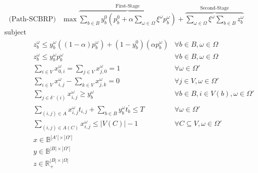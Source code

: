 \begin{align}
	\text{(Path-SCBRP)} & \max \overbrace{\sum_{b \in B} y_{b}^{0}(p_{b}^{0} + \alpha \sum_{\omega \in \Omega} \xi^{\omega} p_{b}^{\omega})}^{\text{First-Stage}} + \overbrace{\sum_{\omega \in \Omega} \xi^{\omega} \sum_{b \in B} z_{b}^{\omega}}^{\text{Second-Stage}} & \label{eq:sof}
\end{align}
\begin{align}
	\nonumber \text{subject to:} &                                                                                                         &                                                                                     \\
	                             & z_{b}^{\omega} \leq y_{b}^{\omega}((1 - \alpha)p_{b}^{\omega}) + (1 - y_{b}^{0})(\alpha p_{b}^{\omega}) & \forall b \in B, \omega \in \Omega \label{eq:stochastic-z-value}                    \\
	                             & z_{b}^{\omega} \leq y_{b}^{\omega}p_{b}^{\omega}                                                        & \forall b \in B, \omega \in \Omega \label{eq:stochastic-z-y-value}                  \\
	                             & \sum_{i \in V} x_{0,i}^{\omega} = \sum_{j \in V} x_{j,0}^{\omega} = 1                                   & \forall \omega \in \Omega' \label{eq:stochastic-s-t-all}                            \\
	                             & \sum_{i \in V} x_{i,j}^{\omega} - \sum_{k \in V} x_{j,k}^{\omega} = 0                                   & \forall j \in V, \omega \in \Omega' \label{eq:stochastic-flow-conservation}         \\
	                             & \sum_{j \in \delta^{-}(i)} x_{i,j}^{\omega} \geq y_{b}^{\omega}                                         & \forall b \in B, i \in V(b), \omega \in \Omega' \label{eq:stochastic-in-path}       \\
	                             & \sum_{(i, j) \in A} x_{i,j}^{\omega}t_{i,j} + \sum_{b \in B} y_{b}^{\omega}t^{'}_{b} \leq T             & \forall \omega \in \Omega' \label{eq:stochastic-max-time}                           \\
	                             & \sum_{(i, j) \in A(C)} x_{i,j}^{\omega} \leq |V(C)| - 1                                                 & \forall C \subseteq V, \omega \in \Omega' \label{eq:stochastic-subtour-elimination} \\
	                             & x \in \mathbb{B}^{|A'| \times |\Omega'|}                                                                & \label{eq:stochastic-dom-x}                                                         \\
	                             & y \in \mathbb{B}^{|B| \times |\Omega'|}                                                                 & \label{eq:stochastic-dom-y}                                                         \\
	                             & z \in \mathbb{R}_{+}^{|B| \times |\Omega|}                                                              & \label{eq:stochastic-dom-z}
\end{align}

